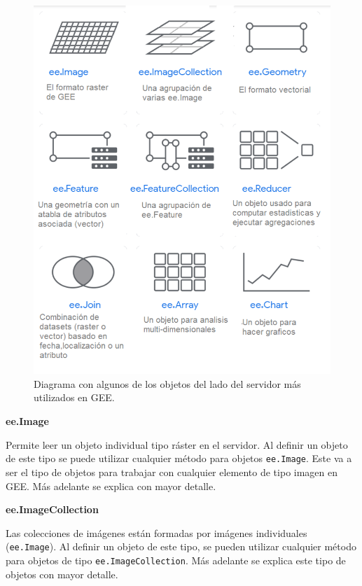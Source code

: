 \documentclass[
  12pt,
  letterpaper,
  twoside]{book}
\begin{document}
\begin{figure}

{\centering \includegraphics[width=1\linewidth]{Img/objetosServ} 

}

\caption{Diagrama con algunos de los objetos del lado del servidor más utilizados en GEE.}\label{fig:unnamed-chunk-50}
\end{figure}

\textbf{ee.Image}

Permite leer un objeto individual tipo ráster en el servidor. Al definir un objeto de este tipo se puede utilizar cualquier método para objetos \texttt{ee.Image}. Este va a ser el tipo de objetos para trabajar con cualquier elemento de tipo imagen en GEE. Más adelante se explica con mayor detalle.

\textbf{ee.ImageCollection}

Las colecciones de imágenes están formadas por imágenes individuales (\texttt{ee.Image}). Al definir un objeto de este tipo, se pueden utilizar cualquier método para objetos de tipo \texttt{ee.ImageCollection}. Más adelante se explica este tipo de objetos con mayor detalle.
\end{document}
